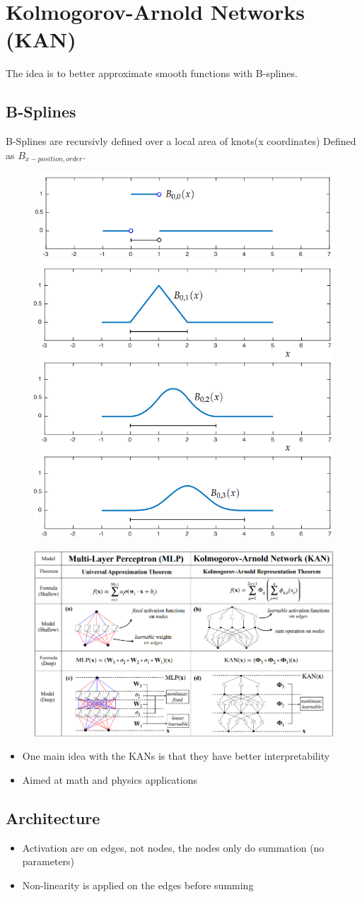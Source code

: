 \section{Kolmogorov-Arnold Networks (KAN)}
The idea is to better approximate smooth functions with B-splines.

\subsection{B-Splines}
B-Splines are recursivly defined over a local area of knots(x coordinates)
Defined as \(B_{x-position,order}\).
\begin{figure}
    \includegraphics[width=0.5\columnwidth]{figures/KAN/BSplines1.png}
    \includegraphics[width=0.5\columnwidth]{figures/KAN/BSplines2.png}
\end{figure}

\begin{figure}
    \includegraphics[width=\columnwidth]{figures/KAN/OverviewKANMLP.png}
\end{figure}
\begin{itemize}
    \item One main idea with the KANs is that they have better interpretability
    \item Aimed at math and physics applications
\end{itemize}
\subsection{Architecture}
\begin{itemize}
    \item Activation are on edges, not nodes, the nodes only do summation (no parameters)
    \item Non-linearity is applied on the edges before summing
\end{itemize}